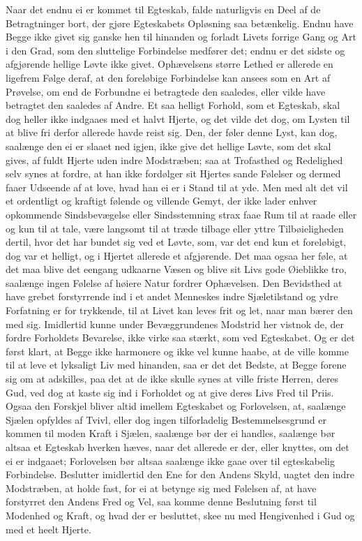 \documentclass[12pt,a4paper]{book}
\newcommand{\apage}[1]{\marginnote{\footnotesize\textit{[#1]}}}
\begin{document}
Naar det endnu ei er kommet til Egteskab, falde naturligvis en Deel af de
Betragtninger bort, der gjøre Egteskabets Opløsning saa betænkelig. Endnu
have Begge ikke givet sig ganske hen til hinanden og forladt Livets
forrige Gang og Art i den Grad, som den sluttelige Forbindelse medfører
det; endnu er det sidste og afgjørende hellige Løvte ikke givet.
Ophævelsens større Lethed er allerede en ligefrem Følge deraf, at den
foreløbige Forbindelse kan ansees som en Art af Prøvelse, om end de
Forbundne ei betragtede den saaledes, eller vilde have betragtet den
saaledes af Andre. Et saa helligt Forhold, som et Egteskab, skal dog
heller ikke indgaaes med et halvt Hjerte, og det vilde det dog, om Lysten
til at blive fri derfor allerede havde reist sig. Den, der føler denne
Lyst, kan dog, saalænge den ei er slaaet ned igjen, ikke give det hellige
Løvte, som det skal gives, af fuldt Hjerte uden indre Modstræben; saa at
Trofasthed og Redelighed selv synes at fordre, at han ikke fordølger sit
Hjertes sande Følelser og dermed faaer Udseende af at love, hvad han ei
er i Stand til at yde. Men med alt det vil et ordentligt og kraftigt
følende og villende Gemyt, der ikke lader enhver opkommende
Sindsbevægelse eller Sindsstemning strax faae Rum til at raade eller og
kun til at tale, være langsomt til at træde tilbage eller yttre
Tilbøieligheden dertil, hvor det har bundet sig \apage{147} ved et Løvte, som, var
det end kun et foreløbigt, dog var et helligt, og i Hjertet allerede et
afgjørende. Det maa ogsaa her føle, at det maa blive det eengang udkaarne
Væsen og blive sit Livs gode Øieblikke tro, saalænge ingen Følelse af
høiere Natur fordrer Ophævelsen. Den Bevidsthed at have grebet
forstyrrende ind i et andet Menneskes indre Sjæletilstand og ydre
Forfatning er for trykkende, til at Livet kan leves frit og let, naar man
bærer den med sig. Imidlertid kunne under Bevæggrundenes Modstrid her
vistnok de, der fordre Forholdets Bevarelse, ikke virke saa stærkt, som
ved Egteskabet. Og er det først klart, at Begge ikke harmonere og ikke
vel kunne haabe, at de ville komme til at leve et lyksaligt Liv med
hinanden, saa er det det Bedste, at Begge forene sig om at adskilles, paa
det at de ikke skulle synes at ville friste Herren, deres Gud, ved dog at
kaste sig ind i Forholdet og at give deres Livs Fred til Priis. Ogsaa den
Forskjel bliver altid imellem Egteskabet og Forlovelsen, at, saalænge
Sjælen opfyldes af Tvivl, eller dog ingen tilforladelig Bestemmelsesgrund
er kommen til moden Kraft i Sjælen, saalænge bør der ei handles, saalænge
bør altsaa et Egteskab hverken hæves, naar det allerede er der, eller
knyttes, om det ei er indgaaet; Forlovelsen bør altsaa saalænge ikke gaae
over til egteskabelig Forbindelse. Beslutter imidlertid den Ene for den
Andens Skyld, uagtet den indre Modstræben, at holde \apage{148} fast, for ei at
betynge sig med Følelsen af, at have forstyrret den Andens Fred og Vel,
saa komme denne Beslutning først til Modenhed og Kraft, og hvad der er
besluttet, skee nu med Hengivenhed i Gud og med et heelt Hjerte.
\end{document}

